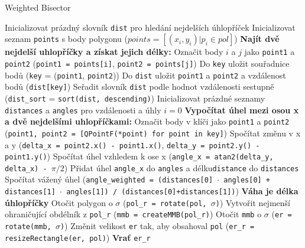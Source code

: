 \documentclass{article}
\begin{document}
\begin{algorithm}
\caption{Weighted Bisector}
\label{alg:weighted_bisector}
\begin{algorithmic}[1]
\STATE Inicializovat prázdný slovník \texttt{dist} pro hledání nejdelších úhlopříček
\STATE Inicializovat seznam \texttt{points} s body polygonu ($points = [(x_i, y_i)| p_i \in pol]$)
\STATE \textbf{Najít dvě nejdelší uhlopříčky a získat jejich délky:} 
      \STATE Označit body $i$ a $j$ jako \texttt{point1} a \texttt{point2} (\texttt{point1 = points[i]}, \texttt{point2 = points[j]})
      \STATE Do \texttt{key} uložit souřadnice bodů (\texttt{key} = (\texttt{point1}, \texttt{point2}))
      \STATE Do \texttt{dist} uložit \texttt{point1} a \texttt{point2} a vzdálenost bodů (\texttt{dist[key]})
    \ENDFOR
  \ENDFOR
\STATE Seřadit slovník \texttt{dist} podle hodnot vzdálenosti sestupně (\texttt{dist\_sort} = \texttt{sort(dist, descending)})
\STATE Inicializovat prázdné seznamy \texttt{distances} a \texttt{angles} pro vzdálenosti a úhly
\STATE $i = 0$
\STATE \textbf{Vypočítat úhel mezi osou x a dvě nejdelšími uhlopříčkami:} 
  \STATE Označit body v klíči jako \texttt{point1} a \texttt{point2} (\texttt{point1, point2 = [QPointF(*point) for point in key]})
  \STATE Spočítat změnu v x a y (\texttt{delta\_x = point2.x() - point1.x()}, \texttt{delta\_y = point2.y() - point1.y()})
  \STATE Spočítat úhel vzhledem k ose x (\texttt{angle\_x = atan2(delta\_y, delta\_x) - $\pi/2$})
  \STATE Přidat úhel \texttt{angle\_x} do \texttt{angles} a délku\texttt{distance} do \texttt{distances}
\ENDFOR
\STATE Spočítat vážený úhel (\texttt{angle\_weighted = (distances[0] $\cdot$ angles[0] + distances[1] $\cdot$ angles[1]) / (distances[0]+distances[1])})
  \STATE \textbf{Váha je délka úhlopříčky} 
\STATE Otočit polygon o $\sigma$ (\texttt{pol\_r = rotate(pol, $\sigma$)})
\STATE Vytvořit nejmenší ohraničující obdélník z \texttt{pol\_r} (\texttt{mmb = createMMB(pol\_r)})
\STATE Otočit \texttt{mmb} o $\sigma$ (\texttt{er = rotate(mmb, $\sigma$)})
\STATE Změnit velikost \texttt{er} tak, aby obsahoval \texttt{pol} (\texttt{er\_r = resizeRectangle(er, pol)})
\STATE \textbf{Vrať} \texttt{er\_r}
\end{algorithmic}
\end{algorithm}
\end{document}
